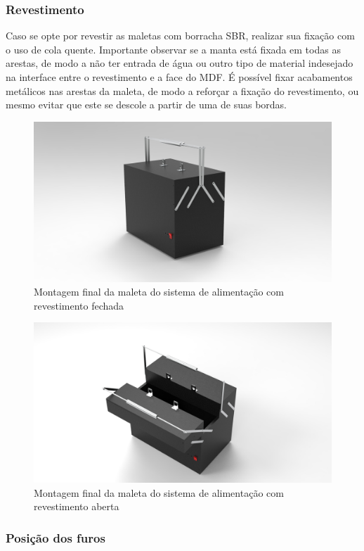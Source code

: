 \subsubsection{Revestimento}

Caso se opte por revestir as maletas com borracha SBR, realizar sua fixação com  o uso de cola quente. Importante observar se a manta está fixada em todas as arestas, de modo a não ter entrada de água ou outro tipo de material indesejado na interface entre o revestimento e a face do MDF. É possível fixar acabamentos metálicos nas arestas da maleta, de modo a reforçar a fixação do revestimento, ou mesmo evitar que este se descole a partir de uma de suas bordas.

\begin{figure} [H]
    \centering
    \includegraphics[width=.5\textwidth]{Figuras/suporte/untitled.4.jpg}
    \caption{Montagem final da maleta do sistema de alimentação com revestimento fechada}
\end{figure}

\begin{figure} [H]
    \centering
    \includegraphics[width=.5\textwidth]{Figuras/suporte/untitled.5.jpg}
    \caption{Montagem final da maleta do sistema de alimentação com revestimento aberta}
\end{figure}

\subsubsection{Posição dos furos}


